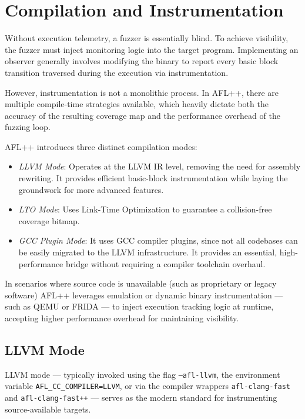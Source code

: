 \section{Compilation and Instrumentation}
\label{sec:compandinst}

Without execution telemetry, a fuzzer is essentially blind. To achieve visibility, the fuzzer must inject monitoring logic into the target program. Implementing an observer generally involves modifying the binary to report every basic block transition traversed during the execution via instrumentation.

However, instrumentation is not a monolithic process. In AFL++, there are multiple compile-time strategies available, which heavily dictate both the accuracy of the resulting coverage map and the performance overhead of the fuzzing loop.

AFL++ introduces three distinct compilation modes:
\begin{itemize}
    \item \textit{LLVM Mode}: Operates at the LLVM IR level, removing the need for assembly rewriting. It provides efficient basic-block instrumentation while laying the groundwork for more advanced features.
    
    \item \textit{LTO Mode}: Uses Link-Time Optimization to guarantee a collision-free coverage bitmap.

    \item \textit{GCC Plugin Mode}: It uses GCC compiler plugins, since not all codebases can be easily migrated to the LLVM infrastructure. It provides an essential, high-performance bridge without requiring a compiler toolchain overhaul.
\end{itemize}

In scenarios where source code is unavailable (such as proprietary or legacy software) AFL++ leverages emulation or dynamic binary instrumentation --- such as QEMU or FRIDA --- to inject execution tracking logic at runtime, accepting higher performance overhead for maintaining visibility.

\subsection{LLVM Mode}
\label{sub:llvmmode}

LLVM mode --- typically invoked using the flag \texttt{--afl-llvm}, the environment variable \texttt{AFL\_CC\_COMPILER=LLVM}, or via the compiler wrappers \texttt{afl-clang-fast} and \texttt{afl-clang-fast++} --- serves as the modern standard for instrumenting source-available targets.

